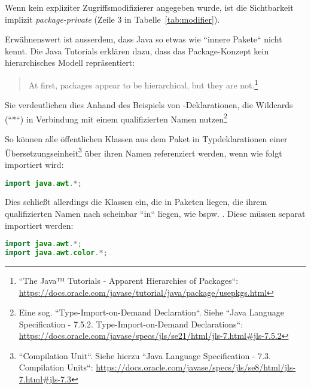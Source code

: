 Wenn kein expliziter Zugriffsmodifizierer angegeben wurde, ist die Sichtbarkeit implizit \textit{package-private} (Zeile 3 in Tabelle~\ref{tab:modifier}).

Erwähnenswert ist ausserdem, dass Java so etwas wie ``innere Pakete`` nicht kennt.
Die Java Tutorials erklären dazu, dass das Package-Konzept kein hierarchisches Modell repräsentiert:\blockquote{
    At first, packages appear to be hierarchical, but they are not.\footnote{
        ``The Java™ Tutorials - Apparent Hierarchies of Packages``: \url{https://docs.oracle.com/javase/tutorial/java/package/usepkgs.html}
    }
}
Sie verdeutlichen dies Anhand des Beispiels von -Deklarationen, die Wildcards (``*``) in Verbindung mit einem qualifizierten Namen
nutzen\footnote{
    Eine sog. ``Type-Import-on-Demand Declaration``. Siehe  ``Java Language Specification - 7.5.2. Type-Import-on-Demand Declarations``: \url{https://docs.oracle.com/javase/specs/jls/se21/html/jls-7.html#jls-7.5.2}
}

So können alle öffentlichen Klassen aus dem Paket  in Typdeklarationen einer Übersetzungseinheit\footnote{
    ``Compilation Unit``. Siehe hierzu ``Java Language Specification - 7.3. Compilation Units``: \url{https://docs.oracle.com/javase/specs/jls/se8/html/jls-7.html#jls-7.3}
} über ihren Namen referenziert werden, wenn wie folgt importiert wird:

\begin{lstlisting}[language=java]
import java.awt.*;
\end{lstlisting}

Dies schließt allerdings  die Klassen ein, die in Paketen liegen, die ihrem qualifizierten Namen nach scheinbar ``in``  liegen,
wie bspw. . Diese müssen separat importiert werden:

\begin{lstlisting}[language=java]
import java.awt.*;
import java.awt.color.*;
\end{lstlisting}
